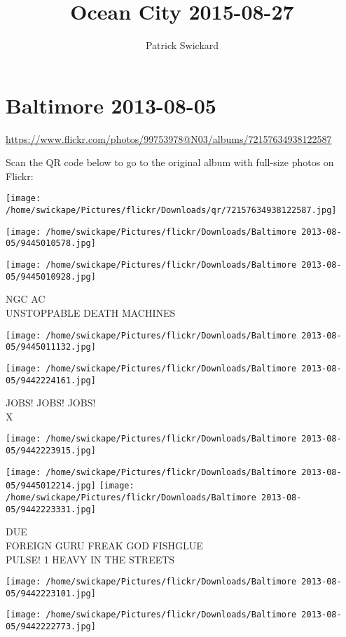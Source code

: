 \documentclass[10pt,letterpaper]{article}
\title{Ocean City 2015-08-27}
\author{Patrick Swickard}
\date{}
\begin{document}
\section*{Baltimore 2013-08-05}

\url{https://www.flickr.com/photos/99753978@N03/albums/72157634938122587}

Scan the QR code below to go to the original album with full-size photos on Flickr:

\texttt{[image: /home/swickape/Pictures/flickr/Downloads/qr/72157634938122587.jpg]}
\pagebreak

\texttt{[image: /home/swickape/Pictures/flickr/Downloads/Baltimore 2013-08-05/9445010578.jpg]}

\vspace{0.25in}
\texttt{[image: /home/swickape/Pictures/flickr/Downloads/Baltimore 2013-08-05/9445010928.jpg]}

NGC AC\\
UNSTOPPABLE DEATH MACHINES
\pagebreak

\texttt{[image: /home/swickape/Pictures/flickr/Downloads/Baltimore 2013-08-05/9445011132.jpg]}

\vspace{0.25in}
\texttt{[image: /home/swickape/Pictures/flickr/Downloads/Baltimore 2013-08-05/9442224161.jpg]}

JOBS! JOBS! JOBS!\\
X
\pagebreak

\texttt{[image: /home/swickape/Pictures/flickr/Downloads/Baltimore 2013-08-05/9442223915.jpg]}

\vspace{0.25in}
\texttt{[image: /home/swickape/Pictures/flickr/Downloads/Baltimore 2013-08-05/9445012214.jpg]}
\texttt{[image: /home/swickape/Pictures/flickr/Downloads/Baltimore 2013-08-05/9442223331.jpg]}

DUE\\
FOREIGN GURU FREAK GOD FISHGLUE\\
PULSE! 1 HEAVY IN THE STREETS
\pagebreak

\texttt{[image: /home/swickape/Pictures/flickr/Downloads/Baltimore 2013-08-05/9442223101.jpg]}

\vspace{0.25in}
\texttt{[image: /home/swickape/Pictures/flickr/Downloads/Baltimore 2013-08-05/9442222773.jpg]}
\end{document}
